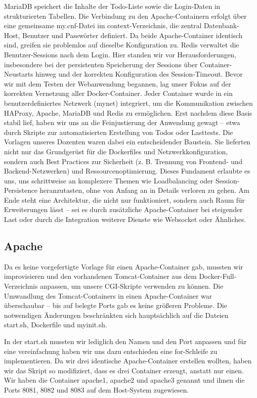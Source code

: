 MariaDB speichert die Inhalte der Todo-Liste sowie die Login-Daten in strukturierten Tabellen. Die Verbindung zu den Apache-Containern erfolgt über eine gemeinsame my.cnf-Datei im context-Verzeichnis, die zentral Datenbank-Host, Benutzer und Passwörter definiert. Da beide Apache-Container identisch sind, greifen sie problemlos auf dieselbe Konfiguration zu. Redis verwaltet die Benutzer-Sessions nach dem Login. Hier standen wir vor Herausforderungen, insbesondere bei der persistenten Speicherung der Sessions über Container-Neustarts hinweg und der korrekten Konfiguration des Session-Timeout. Bevor wir mit dem Testen der Webanwendung begannen, lag unser Fokus auf der korrekten Vernetzung aller Docker-Container. Jeder Container wurde in ein benutzerdefiniertes Netzwerk (mynet) integriert, um die Kommunikation zwischen HAProxy, Apache, MariaDB und Redis zu ermöglichen. Erst nachdem diese Basis stabil lief, haben wir uns an die Feinjustierung der Anwendung gewagt – etwa durch Skripte zur automatisierten Erstellung von Todos oder Lasttests. Die Vorlagen unseres Dozenten waren dabei ein entscheidender Baustein. Sie lieferten nicht nur das Grundgerüst für die Dockerfiles und Netzwerkkonfiguration, sondern auch Best Practices zur Sicherheit (z. B. Trennung von Frontend- und Backend-Netzwerken) und Ressourcenoptimierung. Dieses Fundament erlaubte es uns, uns schrittweise an komplexere Themen wie Loadbalancing oder Session-Persistence heranzutasten, ohne von Anfang an in Details verloren zu gehen. Am Ende steht eine Architektur, die nicht nur funktioniert, sondern auch Raum für Erweiterungen lässt – sei es durch zusätzliche Apache-Container bei steigender Last oder durch die Integration weiterer Dienste wie Websocket oder Ähnliches.

\subsection{Apache}
Da es keine vorgefertigte Vorlage für einen Apache-Container gab, mussten wir improvisieren und den vorhandenen Tomcat-Container aus dem Docker-Full-Verzeichnis anpassen, um unsere CGI-Skripte verwenden zu können. Die Umwandlung des Tomcat-Containers in einen Apache-Container war überschaubar – bis auf belegte Ports gab es keine größeren Probleme. Die notwendigen Änderungen beschränkten sich hauptsächlich auf die Dateien start.sh, Dockerfile und myinit.sh.

In der start.sh mussten wir lediglich den Namen und den Port anpassen und für eine vereinfachung haben wir uns dazu entschieden eine for-Schleife zu implementieren. Da wir drei identische Apache-Container erstellen wollten, haben wir das Skript so modifiziert, dass es drei Container erzeugt, anstatt nur einen. Wir haben die Container apache1, apache2 und apache3 genannt und ihnen die Ports 8081, 8082 und 8083 auf dem Host-System zugewiesen.

